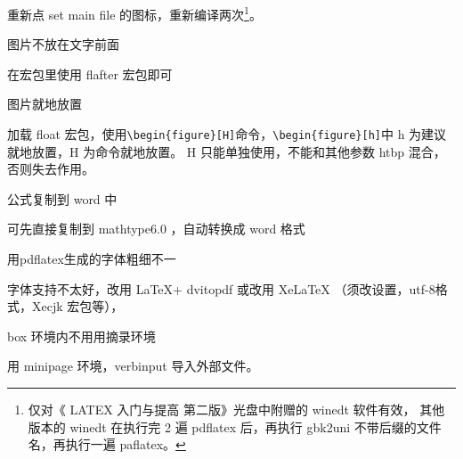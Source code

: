 \begin{list}
重新点 set main file 的图标，重新编译两次\footnote{仅对《 LATEX 入门与提高 第二版》光盘中附赠的 winedt 软件有效，
其他版本的 winedt 在执行完 2 遍 pdflatex 后，再执行 gbk2uni 不带后缀的文件名，再执行一遍 paflatex。}。



\item
\color{red}
图片不放在文字前面\\
\normalcolor

 在宏包里使用 flafter 宏包即可



\item
\color{red}
图片就地放置\\
\normalcolor


        加载 float 宏包，使用\verb$\begin{figure}[H]$命令，\verb$\begin{figure}[h]$中 h 为建议就地放置，H 为命令就地放置。
        H 只能单独使用，不能和其他参数 htbp 混合，否则失去作用。



\item
\color{red}
公式复制到 word 中\\
\normalcolor


        可先直接复制到 mathtype6.0 ，自动转换成 word 格式



\item
\color{red}
用pdflatex生成的字体粗细不一\\
\normalcolor

 字体支持不太好，改用 \LaTeX + dvitopdf 或改用 XeLaTeX （须改设置，utf-8格式，Xecjk 宏包等），




\item
\color{red}
box 环境内不用用摘录环境\\
\normalcolor

        用 minipage 环境，verbinput 导入外部文件。



\end{list}
